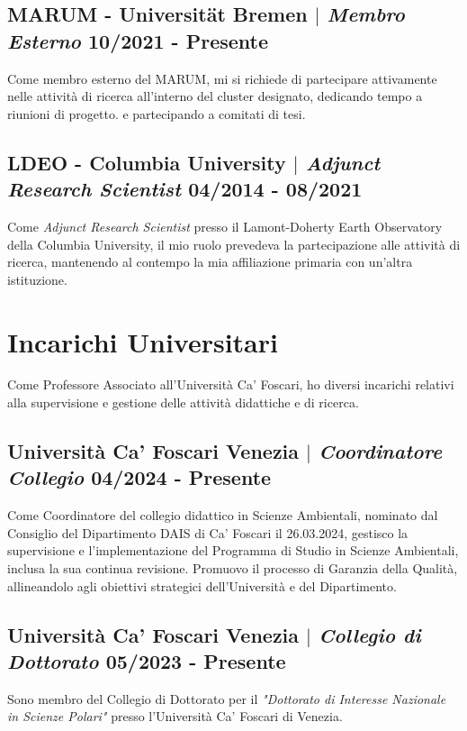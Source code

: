 \documentclass[11pt]{article}
\begin{document}
\subsection{MARUM - Universität Bremen $|$ {\normalfont\textit{Membro Esterno}} \hfill 10/2021 - Presente}
{\footnotesize Come membro esterno del MARUM, mi si richiede di partecipare attivamente nelle attività di ricerca all'interno del cluster designato, dedicando tempo a riunioni di progetto. e partecipando a comitati di tesi.}
\bigskip

\subsection{LDEO - Columbia University $|$ {\normalfont\textit{Adjunct Research Scientist}} \hfill 04/2014 - 08/2021}
{\footnotesize Come \textit{Adjunct Research Scientist} presso il Lamont-Doherty Earth Observatory della Columbia University, il mio ruolo prevedeva la partecipazione alle attività di ricerca, mantenendo al contempo la mia affiliazione primaria con un'altra istituzione.}

\section{Incarichi Universitari}
{\normalfont Come Professore Associato all'Università Ca' Foscari, ho diversi incarichi relativi alla supervisione e gestione delle attività didattiche e di ricerca.}\\
\bigskip
\subsection{Università Ca' Foscari Venezia $|$ {\normalfont\textit{Coordinatore Collegio}} \hfill 04/2024 - Presente}
{\footnotesize Come Coordinatore del collegio didattico in Scienze Ambientali, nominato dal Consiglio del Dipartimento DAIS di Ca' Foscari il 26.03.2024, gestisco la supervisione e l'implementazione del Programma di Studio in Scienze Ambientali, inclusa la sua continua revisione. Promuovo il processo di Garanzia della Qualità, allineandolo agli obiettivi strategici dell'Università e del Dipartimento.}
\bigskip

\subsection{Università Ca' Foscari Venezia $|$ {\normalfont\textit{Collegio di Dottorato}} \hfill 05/2023 - Presente}
{\footnotesize Sono membro del Collegio di Dottorato per il \textit{"Dottorato di Interesse Nazionale in Scienze Polari"} presso l'Università Ca' Foscari di Venezia.}
\bigskip
\end{document}

